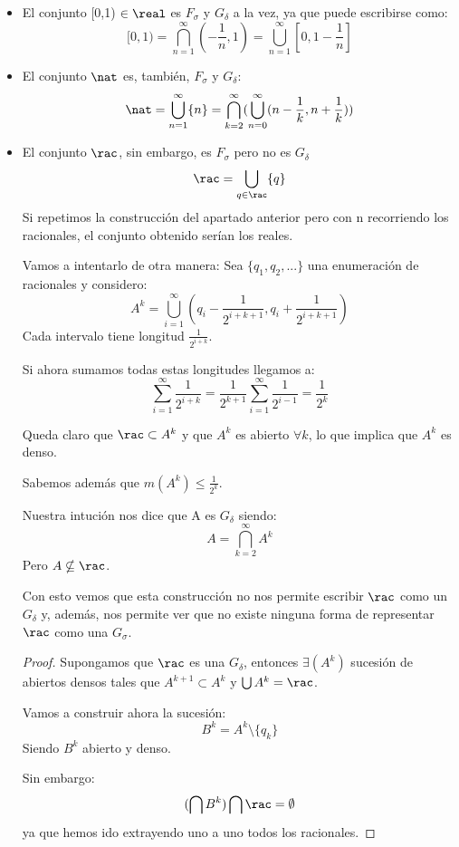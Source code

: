 \documentclass{apuntes}
\begin{document}
\begin{example}
\begin{itemize}
\item El conjunto [0,1) $\in \real$ es $F_\sigma$ y $G_\delta$ a la vez, ya que puede escribirse como:
\[[0,1) = \bigcap_{n=1}^{\infty}(-\frac{1}{n}, 1) = \bigcup_{n=1}^{\infty}[0, 1-\frac{1}{n}]\]

\item El conjunto $\nat$ es, también, $F_\sigma$ y $G_\delta$:
\[\nat = \bigcup_{n=1}^{\infty}\{n\} = \bigcap_{k=2}^{\infty}(\bigcup_{n=0}^{\infty}(n-\frac{1}{k}, n+ \frac{1}{k}))\]

\item El conjunto $\rac$, sin embargo, es $F_\sigma$ pero no es $G_\delta$
\[\rac = \bigcup_{q \in \rac}\{q\} \]
Si repetimos la construcción del apartado anterior pero con n recorriendo los racionales, el conjunto obtenido serían los reales.

Vamos a intentarlo de otra manera:
Sea $\{q_1, q_2, ...\}$ una enumeración de racionales y considero:
\[A^k=\bigcup_{i=1}^{\infty}(q_i-\frac{1}{2^{i+k+1}}, q_i+\frac{1}{2^{i+k+1}})\]
Cada intervalo tiene longitud $\frac{1}{2^{i+k}}$.

Si ahora sumamos todas estas longitudes llegamos a:
\[\sum_{i=1}^{\infty}\frac{1}{2^{i+k}} = \frac{1}{2^{k+1}}\sum_{i=1}^{\infty}\frac{1}{2^{i-1}}=\frac{1}{2^k}\]

Queda claro que $\rac \subset A^k$ y que $A^k$ es abierto $\forall k$, lo que implica que $A^k$ es denso.

Sabemos además que $m(A^k)\leq \frac{1}{2^k}$.

Nuestra intución nos dice que A es $G_\delta$ siendo:
\[A= \bigcap_{k=2}^{\infty}A^k\]
Pero $A \nsubseteq \rac$.

Con esto vemos que esta construcción no nos permite escribir $\rac$ como un $G_\delta$ y, además, nos permite ver que no existe ninguna forma de representar $\rac$ como una $G_\sigma$.

\begin{proof}
Supongamos que $\rac$ es una $G_\delta$, entonces $\exists(A^k)$ sucesión de abiertos densos tales que $A^{k+1} \subset A^k$ y $\bigcup A^k=\rac$.

Vamos a construir ahora la sucesión:
\[B^k=A^k\setminus \{q_k\}\]
Siendo $B^k$ abierto y denso.

Sin embargo:
\[(\bigcap B^k)\bigcap \rac = \emptyset\]
ya que hemos ido extrayendo uno a uno todos los racionales.


\end{proof}
\end{itemize}
\end{example}
\end{document}
